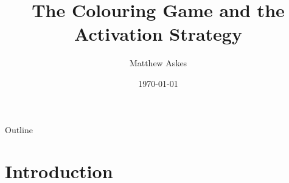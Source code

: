 \documentclass{beamer}
\title[The Colouring Game and the Activ. Strat.]{The Colouring Game and the Activation Strategy}
\author{Matthew Askes}
\institute[Victoria University]{Victoria University of Wellington}
\date{\today}
\begin{document}
\frame{\titlepage}


\begin{frame}{Outline}
    \tableofcontents
\end{frame}

\section{Introduction}


%      
%             
%            
%    
\end{document}
